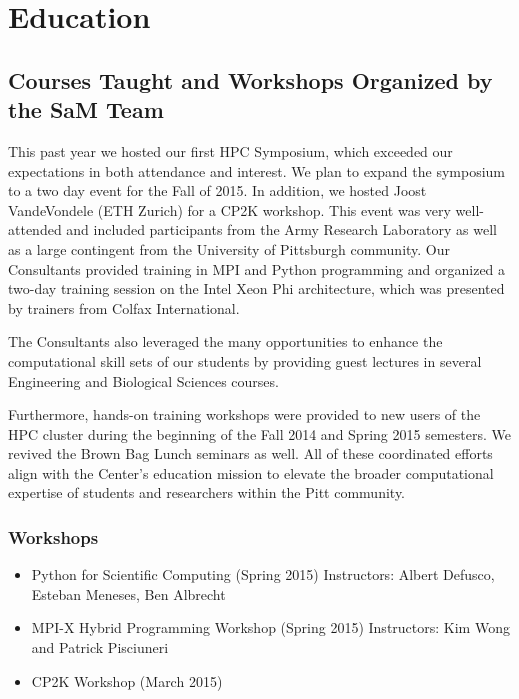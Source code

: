 \chapter{Education}

\section{Courses Taught and Workshops Organized by the SaM
Team}

This past year we hosted our first HPC Symposium, which exceeded our
expectations in both attendance and interest.  We plan to expand the symposium
to a two day event for the Fall of 2015.  In addition, we hosted Joost
VandeVondele (ETH Zurich) for a CP2K workshop.  This event was very
well-attended and included participants from the Army Research Laboratory as
well as a large contingent from the University of Pittsburgh community.  Our Consultants provided training in MPI and Python programming and organized a
two-day training session on the Intel Xeon Phi architecture, which was
presented by trainers from Colfax International.

The Consultants also leveraged the many opportunities to enhance the
computational skill sets of our students by providing guest lectures in several
Engineering and Biological Sciences courses.

Furthermore, hands-on training workshops were provided to new users of the HPC
cluster during the beginning of the Fall 2014 and Spring 2015 semesters.  We
revived the Brown Bag Lunch seminars as well.  All of these coordinated
efforts align with the Center's education mission to elevate the broader
computational expertise of students and researchers within the Pitt community.

\subsection{Workshops}
\begin{itemize}
    \item Python for Scientific Computing (Spring 2015)
          Instructors: Albert Defusco, Esteban Meneses, Ben Albrecht

    \item MPI-X Hybrid Programming Workshop (Spring 2015)
          Instructors: Kim Wong and Patrick Pisciuneri

    \item CP2K Workshop (March 2015)

\end{itemize}

